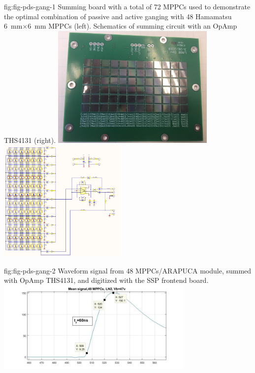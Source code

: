 \begin{dunefigure}
 {fig:fig-pds-gang-1}
 {Summing board with a total of 72 MPPCs used to demonstrate the optimal combination of passive and active ganging with 48 Hamamatsu \SI{6}{mm}$\times$\SI{6}{mm} MPPCs (left).  Schematics of summing circuit with an OpAmp THS4131 (right).}
\includegraphics[height=6cm]{graphics/pds_gang_fig1.jpg}
\includegraphics[height=6cm]{graphics/pds_gang_fig2.png}
\end{dunefigure}

\begin{dunefigure}
 {fig:fig-pds-gang-2}
 {Waveform signal from 48 MPPCs/ARAPUCA module, summed with OpAmp THS4131, and digitized with the SSP frontend board.}
\includegraphics[height=4.5cm]{graphics/pds_gang_fig3.jpg}
\end{dunefigure}

